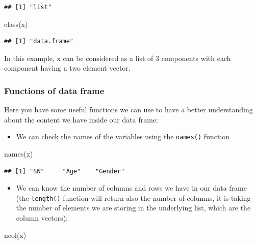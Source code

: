 \documentclass[
]{book}
\newenvironment{Shaded}{\begin{snugshade}}{\end{snugshade}}
\newcommand{\FunctionTok}[1]{\textcolor[rgb]{0.00,0.00,0.00}{#1}}
\newcommand{\NormalTok}[1]{#1}
\providecommand{\tightlist}{%
  \setlength{\itemsep}{0pt}\setlength{\parskip}{0pt}}
\theoremstyle{definition}
\theoremstyle{definition}
\theoremstyle{definition}
\theoremstyle{definition}
\theoremstyle{remark}
\begin{document}
\begin{verbatim}
## [1] "list"
\end{verbatim}

\begin{Shaded}
\begin{Highlighting}[]
\FunctionTok{class}\NormalTok{(x)}
\end{Highlighting}
\end{Shaded}

\begin{verbatim}
## [1] "data.frame"
\end{verbatim}

In this example, x can be considered as a list of 3 components with each component having a two element vector.

\hypertarget{functions-of-data-frame}{%
\subsubsection{Functions of data frame}\label{functions-of-data-frame}}

Here you have some useful functions we can use to have a better understanding about the content we have inside our data frame:

\begin{itemize}
\tightlist
\item
  We can check the names of the variables using the \texttt{names()} function
\end{itemize}

\begin{Shaded}
\begin{Highlighting}[]
\FunctionTok{names}\NormalTok{(x)}
\end{Highlighting}
\end{Shaded}

\begin{verbatim}
## [1] "SN"     "Age"    "Gender"
\end{verbatim}

\begin{itemize}
\tightlist
\item
  We can know the number of columns and rows we have in our data frame (the \texttt{length()} function will return also the number of columns, it is taking the number of elements we are storing in the underlying list, which are the column vectors):
\end{itemize}

\begin{Shaded}
\begin{Highlighting}[]
\FunctionTok{ncol}\NormalTok{(x)}
\end{Highlighting}
\end{Shaded}
\end{document}
